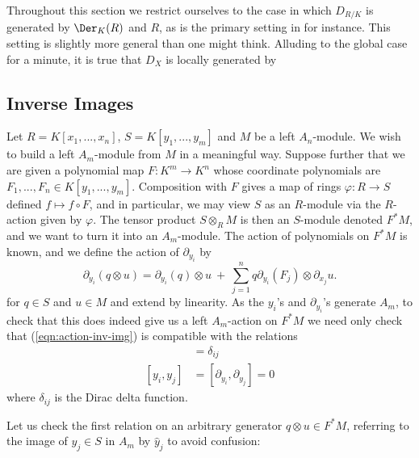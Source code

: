 Throughout this section we restrict ourselves to the case in which $D_{R/K}$ is generated by $\Der_{K}(R)$ and $R$, as is the primary setting in \cite{d-mod_ps-rt} for instance. This setting is slightly more general than one might think. Alluding to the global case for a minute, it is true that $D_X$ is locally generated by 

\subsection{Inverse Images}
Let $R = K[x_1,...,x_n]$, $S = K[y_1,...,y_m]$ and $M$ be a left $A_n$-module. We wish to build a left $A_m$-module from $M$ in a meaningful way. Suppose further that we are given a polynomial map $F:K^m\to K^n$ whose coordinate polynomials are $F_1,...,F_n\in K[y_1,...,y_m]$. Composition with $F$ gives a map of rings $\varphi:R\to S$ defined $f\mapsto f\circ F$, and in particular, we may view $S$ as an $R$-module via the $R$-action given by $\varphi$. The tensor product $S\otimes_R M$ is then an $S$-module denoted $F^*M$, and we want to turn it into an $A_m$-module. The action of polynomials on $F^*M$ is known, and we define the action of $\partial_{y_i}$ by
\begin{equation}\label{eqn:action-inv-img}\tag{$\ast$}
	\partial_{y_i}(q\otimes u) = \partial_{y_i}(q) \otimes u ~ + ~ \sum_{j=1}^n q\partial_{y_i}(F_j) \otimes \partial_{x_j} u.
\end{equation}
for $q\in S$ and $u\in M$ and extend by linearity. As the $y_i$'s and $\partial_{y_i}$'s generate $A_m$, to check that this does indeed give us a left $A_m$-action on $F^*M$ we need only check that (\ref{eqn:action-inv-img}) is compatible with the relations
\begin{align*}
	[\partial_{y_i}, y_j] &= \delta_{ij} \\
	[y_i,y_j] &= [\partial_{y_i},\partial_{y_j}] = 0
\end{align*}
where $\delta_{ij}$ is the Dirac delta function.

Let us check the first relation on an arbitrary generator $q\otimes u \in F^*M$, referring to the image of $y_j \in S$ in $A_m$ by $\hat{y}_j$ to avoid confusion:


